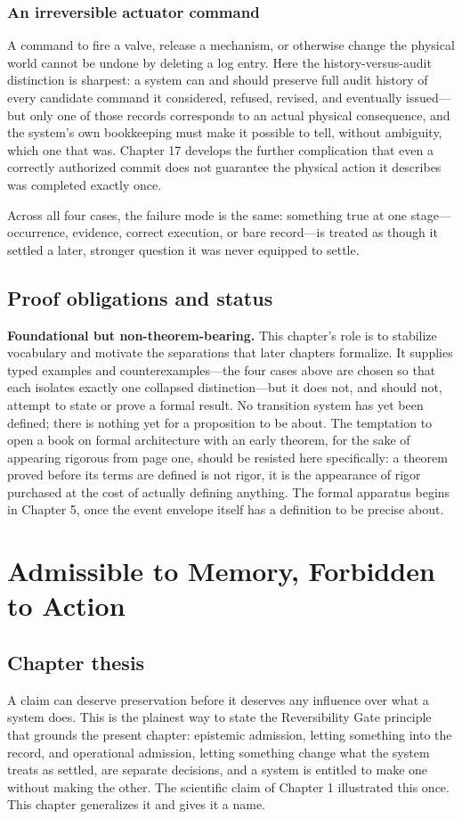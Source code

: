 \documentclass[11pt,openany]{book}
\begin{document}
\subsection{An irreversible actuator command}

A command to fire a valve, release a mechanism, or otherwise change the
physical world cannot be undone by deleting a log entry. Here the
history-versus-audit distinction is sharpest: a system can and should preserve
full audit history of every candidate command it considered, refused, revised,
and eventually issued---but only one of those records corresponds to an actual
physical consequence, and the system's own bookkeeping must make it possible
to tell, without ambiguity, which one that was. Chapter 17 develops the
further complication that even a correctly authorized commit does not
guarantee the physical action it describes was completed exactly once.

Across all four cases, the failure mode is the same: something true at one
stage---occurrence, evidence, correct execution, or bare record---is treated as
though it settled a later, stronger question it was never equipped to settle.

\section{Proof obligations and status}
\textbf{Foundational but non-theorem-bearing.} This chapter's role is to
stabilize vocabulary and motivate the separations that later chapters
formalize. It supplies typed examples and counterexamples---the four cases
above are chosen so that each isolates exactly one collapsed distinction---but
it does not, and should not, attempt to state or prove a formal result. No
transition system has yet been defined; there is nothing yet for a proposition
to be about. The temptation to open a book on formal architecture with an
early theorem, for the sake of appearing rigorous from page one, should be
resisted here specifically: a theorem proved before its terms are defined is
not rigor, it is the appearance of rigor purchased at the cost of actually
defining anything. The formal apparatus begins in Chapter 5, once the event
envelope itself has a definition to be precise about.

\chapter{Admissible to Memory, Forbidden to Action}
\section{Chapter thesis}
A claim can deserve preservation before it deserves any influence over what a
system does. This is the plainest way to state the Reversibility Gate principle
that grounds the present chapter: epistemic admission, letting something into
the record, and operational admission, letting something change what the
system treats as settled, are separate decisions, and a system is entitled to
make one without making the other. The scientific claim of Chapter 1
illustrated this once. This chapter generalizes it and gives it a name.
\end{document}
